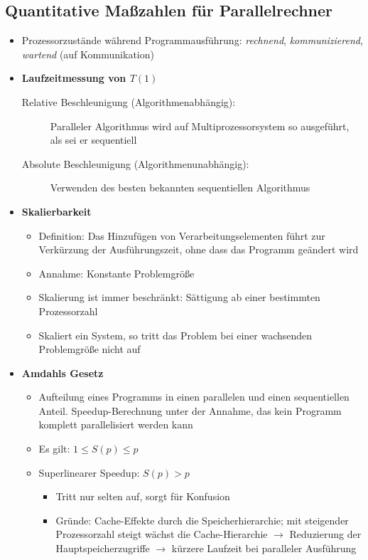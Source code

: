 \subsection{Quantitative Maßzahlen für Parallelrechner}
\begin{itemize}
	\item Prozessorzustände während Programmausführung: \textit{rechnend}, \textit{kommunizierend}, \textit{wartend} (auf Kommunikation)
	\item \textbf{Laufzeitmessung von \(T(1)\)}
	\begin{description}
		\item[Relative Beschleunigung (Algorithmenabhängig):] Paralleler Algorithmus wird auf Multiprozessorsystem so ausgeführt, als sei er sequentiell
		\item[Absolute Beschleunigung (Algorithmenunabhängig):] Verwenden des besten bekannten sequentiellen Algorithmus
	\end{description}
	\item \textbf{Skalierbarkeit}
	\begin{itemize}
		\item Definition: Das Hinzufügen von Verarbeitungselementen führt zur Verkürzung der Ausführungszeit, ohne dass das Programm geändert wird
		\item Annahme: Konstante Problemgröße
		\item Skalierung ist immer beschränkt: Sättigung ab einer bestimmten Prozessorzahl
		\item Skaliert ein System, so tritt das Problem bei einer wachsenden Problemgröße nicht auf
	\end{itemize}
	\item \textbf{Amdahls Gesetz}
	\begin{itemize}
		\item Aufteilung eines Programms in einen parallelen und einen sequentiellen Anteil. Speedup-Berechnung unter der Annahme, das kein Programm komplett parallelisiert werden kann
		\item Es gilt: \(1 \le S(p) \le p\)
		\item Superlinearer Speedup: \(S(p) > p\)
		\begin{itemize}
			\item Tritt nur selten auf, sorgt für Konfusion
			\item Gründe: Cache-Effekte durch die Speicherhierarchie; mit steigender Prozessorzahl steigt wächst die Cache-Hierarchie \(\rightarrow\) Reduzierung der Hauptspeicherzugriffe \(\rightarrow\) kürzere Laufzeit bei paralleler Ausführung
		\end{itemize}
	\end{itemize}
\end{itemize}


